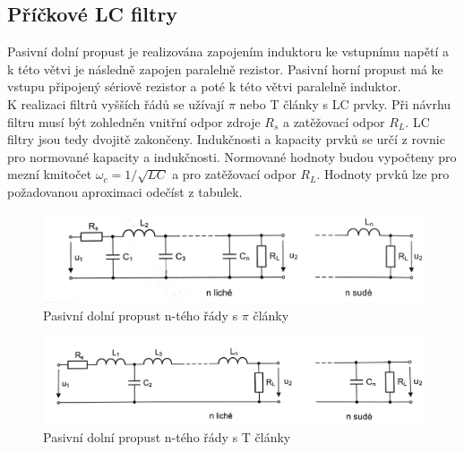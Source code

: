 \subsection{Příčkové LC filtry}\label{s:LC}
Pasivní dolní propust je realizována zapojením induktoru ke vstupnímu napětí a k této větvi je následně zapojen paralelně rezistor. Pasivní horní propust má ke vstupu připojený sériově rezistor a poté k této větvi paralelně induktor. \\
K realizaci filtrů vyšších řádů se užívají $\pi$ nebo T články s LC prvky. Při návrhu filtru musí být zohledněn vnitřní odpor zdroje $R_s$ a zatěžovací odpor $R_L$. LC filtry jsou tedy dvojitě zakončeny. Indukčnosti a kapacity prvků se určí z rovnic pro normované kapacity a indukčnosti. Normované hodnoty budou vypočteny pro mezní kmitočet $\omega _c = 1/\sqrt{LC}$ a pro zatěžovací odpor $R_L$. Hodnoty prvků lze pro požadovanou aproximaci odečíst z tabulek. \\
\begin{figure}[h]
\centering
\includegraphics[scale=0.1]{piclanky.png}
\caption{Pasivní dolní propust n-tého řády s $\pi$ články \cite{14}}
\end{figure}
\begin{figure}[h]
\centering
\includegraphics[scale=0.08]{tclanky.png}
\caption{Pasivní dolní propust n-tého řády s T články \cite{14}}
\end{figure}
\newpage

